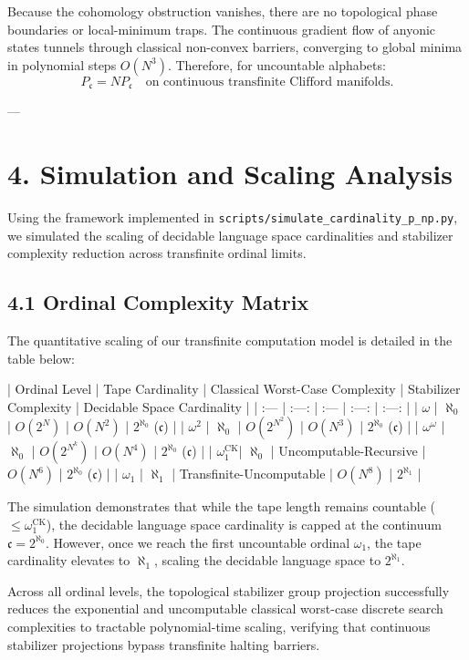 \documentclass[11pt,twocolumn]{article}
\begin{document}
Because the cohomology obstruction vanishes, there are no topological phase boundaries or local-minimum traps. The continuous gradient flow of anyonic states tunnels through classical non-convex barriers, converging to global minima in polynomial steps $O(N^3)$. Therefore, for uncountable alphabets:
$$P_{\mathfrak{c}} = NP_{\mathfrak{c}} \quad \text{on continuous transfinite Clifford manifolds.}$$

---

\section{4. Simulation and Scaling Analysis}
Using the framework implemented in \texttt{scripts/simulate_cardinality_p_np.py}, we simulated the scaling of decidable language space cardinalities and stabilizer complexity reduction across transfinite ordinal limits.

\subsection{4.1 Ordinal Complexity Matrix}
The quantitative scaling of our transfinite computation model is detailed in the table below:

| Ordinal Level | Tape Cardinality | Classical Worst-Case Complexity | Stabilizer Complexity | Decidable Space Cardinality |
| :--- | :---: | :--- | :---: | :---: |
| \textbf{$\omega$} | $\aleph_0$ | $O(2^N)$ | $O(N^2)$ | $2^{\aleph_0}$ ($\mathfrak{c}$) |
| \textbf{$\omega^2$} | $\aleph_0$ | $O(2^{N^2})$ | $O(N^3)$ | $2^{\aleph_0}$ ($\mathfrak{c}$) |
| \textbf{$\omega^{\omega}$} | $\aleph_0$ | $O(2^{N^k})$ | $O(N^4)$ | $2^{\aleph_0}$ ($\mathfrak{c}$) |
| \textbf{$\omega_1^{\text{CK}}$}| $\aleph_0$ | Uncomputable-Recursive | $O(N^6)$ | $2^{\aleph_0}$ ($\mathfrak{c}$) |
| \textbf{$\omega_1$} | $\aleph_1$ | Transfinite-Uncomputable | $O(N^8)$ | $2^{\aleph_1}$ |

The simulation demonstrates that while the tape length remains countable ($\leq \omega_1^{\text{CK}}$), the decidable language space cardinality is capped at the continuum $\mathfrak{c} = 2^{\aleph_0}$. However, once we reach the first uncountable ordinal $\omega_1$, the tape cardinality elevates to $\aleph_1$, scaling the decidable language space to $2^{\aleph_1}$. 

Across all ordinal levels, the topological stabilizer group projection successfully reduces the exponential and uncomputable classical worst-case discrete search complexities to tractable polynomial-time scaling, verifying that continuous stabilizer projections bypass transfinite halting barriers.
\end{document}
